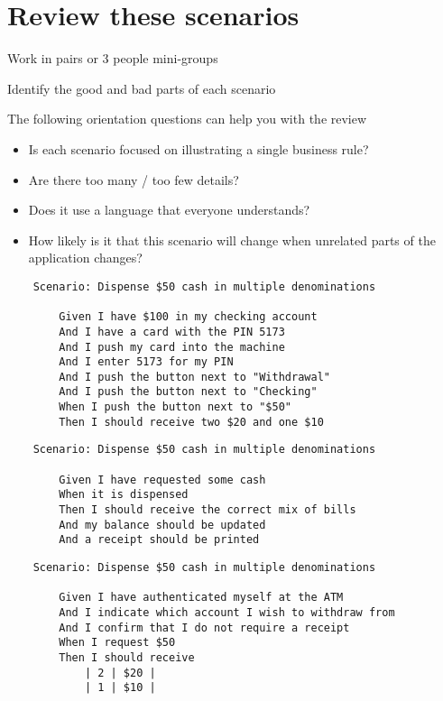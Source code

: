 \chapter*{Review these scenarios}

\ifnotes

\fi

\ifcontent
    Work in pairs or 3 people mini-groups
    
    Identify the good and bad parts of each scenario
    
    The following orientation questions can help you with the review
    
    \begin{itemize}
        \item Is each scenario focused on illustrating a single business rule?
        \item Are there too many / too few details?
        \item Does it use a language that everyone understands?
        \item How likely is it that this scenario will change when unrelated parts of the application changes?
    \end{itemize}
    
    \begin{framed}
        \begin{verbatim}
    Scenario: Dispense $50 cash in multiple denominations
    
        Given I have $100 in my checking account
        And I have a card with the PIN 5173
        And I push my card into the machine
        And I enter 5173 for my PIN
        And I push the button next to "Withdrawal"
        And I push the button next to "Checking"
        When I push the button next to "$50"
        Then I should receive two $20 and one $10
        \end{verbatim}
    \end{framed}
    
    \begin{framed}
        \begin{verbatim}
    Scenario: Dispense $50 cash in multiple denominations
    
        Given I have requested some cash 
        When it is dispensed 
        Then I should receive the correct mix of bills 
        And my balance should be updated 
        And a receipt should be printed
        \end{verbatim}
    \end{framed}
    
    \begin{framed}
        \begin{verbatim}
    Scenario: Dispense $50 cash in multiple denominations
    
        Given I have authenticated myself at the ATM
        And I indicate which account I wish to withdraw from
        And I confirm that I do not require a receipt
        When I request $50
        Then I should receive 
            | 2 | $20 | 
            | 1 | $10 |
        \end{verbatim}
    \end{framed}
\fi
